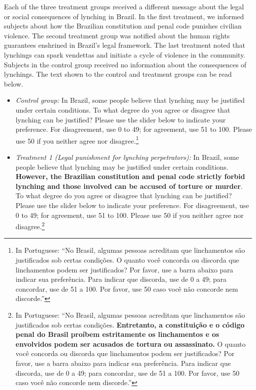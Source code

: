 \documentclass[12pt,ansiapaper]{article}
\providecommand{\tightlist}{%
   \setlength{\itemsep}{0pt}\setlength{\parskip}{0pt}}
\begin{document}
Each of the three treatment groups received a different message about the legal or social consequences of lynching in Brazil. In the first treatment, we informed subjects about how the Brazilian constitution and penal code punishes civilian violence. The second treatment group was notified about the human rights guarantees enshrined in Brazil's legal framework. The last treatment noted that lynchings can spark vendettas and initiate a cycle of violence in the community. Subjects in the control group received no information about the consequences of lynchings. The text shown to the control and treatment groups can be read below.

\begin{itemize}
\tightlist
\item
  \emph{Control group:} In Brazil, some people believe that lynching may be justified under certain conditions. To what degree do you agree or disagree that lynching can be justified? Please use the slider below to indicate your preference. For disagreement, use 0 to 49; for agreement, use 51 to 100. Please use 50 if you neither agree nor disagree.\footnote{In Portuguese: ``No Brasil, algumas pessoas acreditam que linchamentos são justificados sob certas condições. O quanto você concorda ou discorda que linchamentos podem ser justificados? Por favor, use a barra abaixo para indicar sua preferência. Para indicar que discorda, use de 0 a 49; para concordar, use de 51 a 100. Por favor, use 50 caso você não concorde nem discorde.''}
\end{itemize}

\begin{itemize}
\tightlist
\item
  \emph{Treatment 1 (Legal punishment for lynching perpetrators):} In Brazil, some people believe that lynching may be justified under certain conditions. \textbf{However, the Brazilian constitution and penal code strictly forbid lynching and those involved can be accused of torture or murder}. To what degree do you agree or disagree that lynching can be justified? Please use the slider below to indicate your preference. For disagreement, use 0 to 49; for agreement, use 51 to 100. Please use 50 if you neither agree nor disagree.\footnote{In Portuguese: ``No Brasil, algumas pessoas acreditam que linchamentos são justificados sob certas condições. \textbf{Entretanto, a constituição e o código penal do Brasil proíbem estritamente os linchamentos e os envolvidos podem ser acusados de tortura ou assassinato.} O quanto você concorda ou discorda que linchamentos podem ser justificados? Por favor, use a barra abaixo para indicar sua preferência. Para indicar que discorda, use de 0 a 49; para concordar, use de 51 a 100. Por favor, use 50 caso você não concorde nem discorde.''}
\end{itemize}
\end{document}
